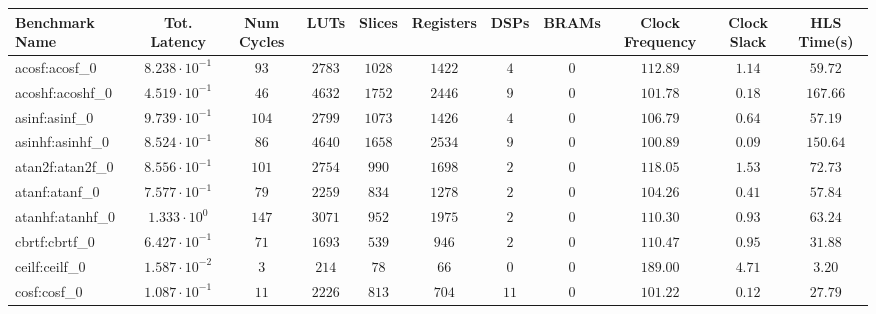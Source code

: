 \begin{tabular}{|l|c|c|c|c|c|c|c|c|c|c|}
\hline
Benchmark Name               & Tot. Latency            & Num Cycles & LUTs      & Slices    & Registers & DSPs    & BRAMs & Clock Frequency & Clock Slack & HLS Time(s) \\
\hline
acosf:acosf\_0               & $ 8.238 \cdot 10^{-1} $ & $ 93     $ & $ 2783  $ & $ 1028  $ & $ 1422  $ & $ 4   $ & $ 0 $ & $ 112.89      $ & $ 1.14    $ & $ 59.72   $ \\
acoshf:acoshf\_0             & $ 4.519 \cdot 10^{-1} $ & $ 46     $ & $ 4632  $ & $ 1752  $ & $ 2446  $ & $ 9   $ & $ 0 $ & $ 101.78      $ & $ 0.18    $ & $ 167.66  $ \\
asinf:asinf\_0               & $ 9.739 \cdot 10^{-1} $ & $ 104    $ & $ 2799  $ & $ 1073  $ & $ 1426  $ & $ 4   $ & $ 0 $ & $ 106.79      $ & $ 0.64    $ & $ 57.19   $ \\
asinhf:asinhf\_0             & $ 8.524 \cdot 10^{-1} $ & $ 86     $ & $ 4640  $ & $ 1658  $ & $ 2534  $ & $ 9   $ & $ 0 $ & $ 100.89      $ & $ 0.09    $ & $ 150.64  $ \\
atan2f:atan2f\_0             & $ 8.556 \cdot 10^{-1} $ & $ 101    $ & $ 2754  $ & $ 990   $ & $ 1698  $ & $ 2   $ & $ 0 $ & $ 118.05      $ & $ 1.53    $ & $ 72.73   $ \\
atanf:atanf\_0               & $ 7.577 \cdot 10^{-1} $ & $ 79     $ & $ 2259  $ & $ 834   $ & $ 1278  $ & $ 2   $ & $ 0 $ & $ 104.26      $ & $ 0.41    $ & $ 57.84   $ \\
atanhf:atanhf\_0             & $ 1.333 \cdot 10^{0}  $ & $ 147    $ & $ 3071  $ & $ 952   $ & $ 1975  $ & $ 2   $ & $ 0 $ & $ 110.30      $ & $ 0.93    $ & $ 63.24   $ \\
cbrtf:cbrtf\_0               & $ 6.427 \cdot 10^{-1} $ & $ 71     $ & $ 1693  $ & $ 539   $ & $ 946   $ & $ 2   $ & $ 0 $ & $ 110.47      $ & $ 0.95    $ & $ 31.88   $ \\
ceilf:ceilf\_0               & $ 1.587 \cdot 10^{-2} $ & $ 3      $ & $ 214   $ & $ 78    $ & $ 66    $ & $ 0   $ & $ 0 $ & $ 189.00      $ & $ 4.71    $ & $ 3.20    $ \\
cosf:cosf\_0                 & $ 1.087 \cdot 10^{-1} $ & $ 11     $ & $ 2226  $ & $ 813   $ & $ 704   $ & $ 11  $ & $ 0 $ & $ 101.22      $ & $ 0.12    $ & $ 27.79   $ \\

\end{tabular}
